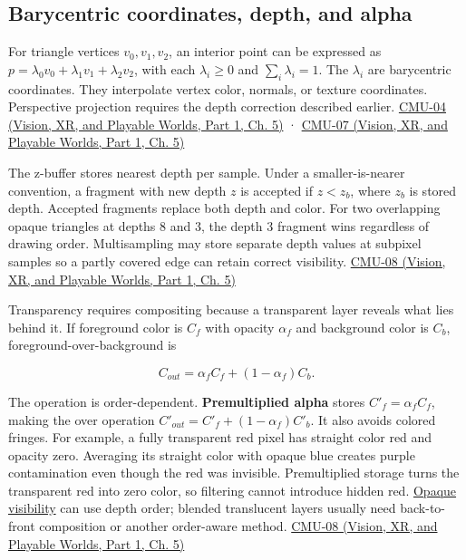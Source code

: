 \subsection{Barycentric coordinates, depth, and alpha}\label{03-visual-computing-i-ch015-barycentric-coordinates-depth-and-alpha}

\hypertarget{03-visual-computing-i-ch015-barycentric-coordinates-depth-and-alpha}{}

For triangle vertices \(v_0,v_1,v_2\), an interior point can be expressed as \(p=\lambda_0v_0+\lambda_1v_1+\lambda_2v_2\), with each \(\lambda_i\ge0\) and \(\sum_i\lambda_i=1\). The \(\lambda_i\) are barycentric coordinates. They interpolate vertex color, normals, or texture coordinates. Perspective projection requires the depth correction described earlier. \href{../07-Vision-XR-and-Playable-Worlds-P01/main.pdf\#nameddest=04-visual-computing-ii-ch036-cmu-04---drawing-a-triangle-and-an-intro-to-sampling}{CMU-04 (Vision, XR, and Playable Worlds, Part 1, Ch. 5)} · \href{../07-Vision-XR-and-Playable-Worlds-P01/main.pdf\#nameddest=04-visual-computing-ii-ch036-cmu-07---perspective-projection-and-texture-mapping}{CMU-07 (Vision, XR, and Playable Worlds, Part 1, Ch. 5)}

The z-buffer stores nearest depth per sample. Under a smaller-is-nearer convention, a fragment with new depth \(z\) is accepted if \(z<z_b\), where \(z_b\) is stored depth. Accepted fragments replace both depth and color. For two overlapping opaque triangles at depths 8 and 3, the depth 3 fragment wins regardless of drawing order. Multisampling may store separate depth values at subpixel samples so a partly covered edge can retain correct visibility. \href{../07-Vision-XR-and-Playable-Worlds-P01/main.pdf\#nameddest=04-visual-computing-ii-ch036-cmu-08---depth-and-transparency}{CMU-08 (Vision, XR, and Playable Worlds, Part 1, Ch. 5)}

Transparency requires compositing because a transparent layer reveals what lies behind it. If foreground color is \(C_f\) with opacity \(\alpha_f\) and background color is \(C_b\), foreground-over-background is

\[
C_{out}=\alpha_fC_f+(1-\alpha_f)C_b.
\]

The operation is order-dependent. \textbf{Premultiplied alpha} stores \(C'_f=\alpha_fC_f\), making the over operation \(C'_{out}=C'_f+(1-\alpha_f)C'_b\). It also avoids colored fringes. For example, a fully transparent red pixel has straight color red and opacity zero. Averaging its straight color with opaque blue creates purple contamination even though the red was invisible. Premultiplied storage turns the transparent red into zero color, so filtering cannot introduce hidden red. \hyperref[appendix-97578ed97952]{Opaque visibility} can use depth order; blended translucent layers usually need back-to-front composition or another order-aware method. \href{../07-Vision-XR-and-Playable-Worlds-P01/main.pdf\#nameddest=04-visual-computing-ii-ch036-cmu-08---depth-and-transparency}{CMU-08 (Vision, XR, and Playable Worlds, Part 1, Ch. 5)}

